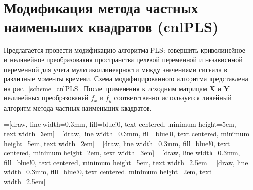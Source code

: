 \documentclass[12pt,twoside]{article}
\newcommand{\bY}{\mathbf{Y}}
\newcommand{\bX}{\mathbf{X}}
\begin{document}

\newpage
\section{Модификация метода частных наименьших квадратов (cnlPLS)}
Предлагается провести модификацию алгоритма PLS: совершить криволинейное и нелинейное преобразования пространства целевой переменной  и независимой переменной для учета мультиколлинеарности между значениями сигнала в различные моменты времени. Схема модифицированного алгоритма представлена на рис.~\ref{scheme_cnlPLS}. 
После применения к исходным матрицам $\bX$ и $\bY$ нелинейных преобразований $f_x$ и $f_y$ соответственно используется линейный алгоритм метода частных наименьших квадратов.


=[draw, line width=0.3mm, fill=blue!0, text centered, minimum height=5em, text width=3em]
=[draw, line width=0.3mm, fill=blue!0, text centered, minimum height=5em, text width=2em]
=[draw, line width=0.3mm, fill=blue!0, text centered, minimum height=2em, text width=3em]
=[draw, line width=0.3mm, fill=blue!0, text centered, minimum height=5em, text width=2.5em]
=[draw, line width=0.3mm, fill=blue!0, text centered, minimum height=2em, text width=2.5em]
\end{document}
